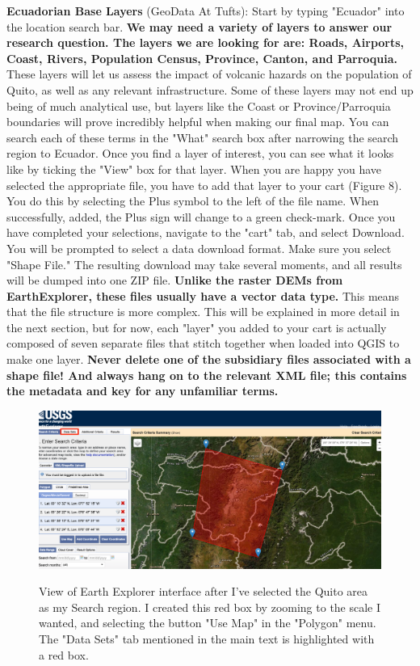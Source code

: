 \documentclass{article}
\begin{document}
\textbf{Ecuadorian Base Layers} (GeoData At Tufts): Start by typing "Ecuador" into the location search bar. \textbf{We may need a variety of layers to answer our research question. The layers we are looking for are: Roads, Airports, Coast, Rivers, Population Census, Province, Canton, and Parroquia.} These layers will let us assess the impact of volcanic hazards on the population of Quito, as well as any relevant infrastructure. Some of these layers may not end up being of much analytical use, but layers like the Coast or Province/Parroquia boundaries will prove incredibly helpful when making our final map. You can search each of these terms in the "What" search box after narrowing the search region to Ecuador. Once you find a layer of interest, you can see what it looks like by ticking the "View" box for that layer. When you are happy you have selected the appropriate file, you have to add that layer to your cart (Figure 8). You do this by selecting the Plus symbol to the left of the file name. When successfully, added, the Plus sign will change to a green check-mark. Once you have completed your selections, navigate to the "cart" tab, and select Download. You will be prompted to select a data download format. Make sure you select "Shape File." The resulting download may take several moments, and all results will be dumped into one ZIP file. \textbf{Unlike the raster DEMs from EarthExplorer, these files usually have a vector data type.} This means that the file structure is more complex. This will be explained in more detail in the next section, but for now, each "layer" you added to your cart is actually composed of seven separate files that stitch together when loaded into QGIS to make one layer. \textbf{Never delete one of the subsidiary files associated with a shape file! And always hang on to the relevant XML file; this contains the metadata and key for any unfamiliar terms.}

\begin{figure}[htbp]
    \centering
    \includegraphics[width=\textwidth]{Fig_7_EE.png}
    \label{fig7}
    \caption{View of Earth Explorer interface after I've selected the Quito area as my Search region. I created this red box by zooming to the scale I wanted, and selecting the button "Use Map" in the "Polygon" menu. The "Data Sets" tab mentioned in the main text is highlighted with a red box.}
\end{figure}
\end{document}
